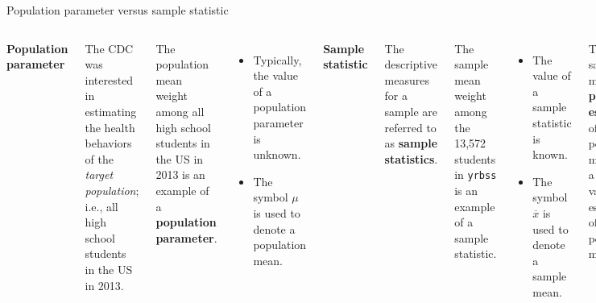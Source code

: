 \documentclass[
  ignorenonframetext,
  aspectratio=169]{beamer}
\newcommand{\columnsbegin}{\begin{columns}}
\newcommand{\columnsend}{\end{columns}}
\begin{document}
\begin{frame}[fragile]{Population parameter versus sample statistic}
\protect\hypertarget{population-parameter-versus-sample-statistic}{}
\columnsbegin


\small

\textbf{Population parameter}

\vspace{0.25cm}

The CDC was interested in estimating the health behaviors of the
\emph{target population}; i.e., all high school students in the US in
2013.

\vspace{0.5cm}

The population mean weight among all high school students in the US in
2013 is an example of a \textbf{population parameter}.

\begin{itemize}
\item
  Typically, the value of a population parameter is unknown.
\item
  The symbol \(\mu\) is used to denote a population mean.
\end{itemize}


\small

\textbf{Sample statistic}

\vspace{0.25cm}

The descriptive measures for a sample are referred to as \textbf{sample
statistics}.

\vspace{0.3cm}

The sample mean weight among the 13,572 students in \texttt{yrbss} is an
example of a sample statistic.

\begin{itemize}
\item
  The value of a sample statistic is known.
\item
  The symbol \(\overline{x}\) is used to denote a sample mean.
\end{itemize}

\vspace{0.3cm}

The sample mean is a \textbf{point estimate} of the population mean;
i.e., a single value estimate of the population mean.

\columnsend
\end{frame}
\end{document}
